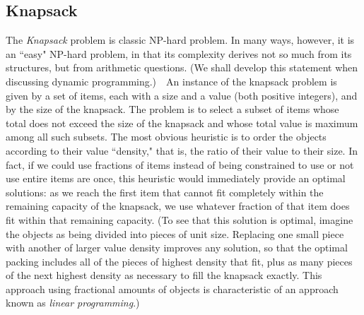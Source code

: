 \documentclass[11pt]{article}
\begin{document}
\subsection{Knapsack}
The \emph{Knapsack} problem is classic NP-hard problem.  In many ways,
however, it is an ``easy" NP-hard problem, in that its complexity derives
not so much from its structures, but from arithmetic questions.
(We shall develop this statement when discussing dynamic programming.)\ \ 
An instance of the knapsack problem is given by a set of items,
each with a size and a value (both positive integers), and by
the size of the knapsack.  The problem is to select a subset of items
whose total does not exceed the size of the knapsack and whose total
value is maximum among all such subsets.  The most obvious heuristic
is to order the objects according to their value ``density,"
that is, the ratio of their value to their size.
In fact, if we could use fractions of items instead of being
constrained to use or not use entire items are once, this heuristic
would immediately provide an optimal solutions: as we reach the first
item that cannot fit completely within the remaining capacity of the
knapsack, we use whatever fraction of that item does fit within that
remaining capacity.
(To see that this solution is optimal, imagine the objects as being divided
into pieces of unit size.  Replacing one small piece with another of larger
value density improves any solution, so that the optimal packing includes
all of the pieces of highest density that fit, plus as many pieces of the
next highest density as necessary to fill the knapsack exactly.  This
approach using fractional amounts of objects is characteristic of an
approach known as \emph{linear programming}.)
\end{document}
